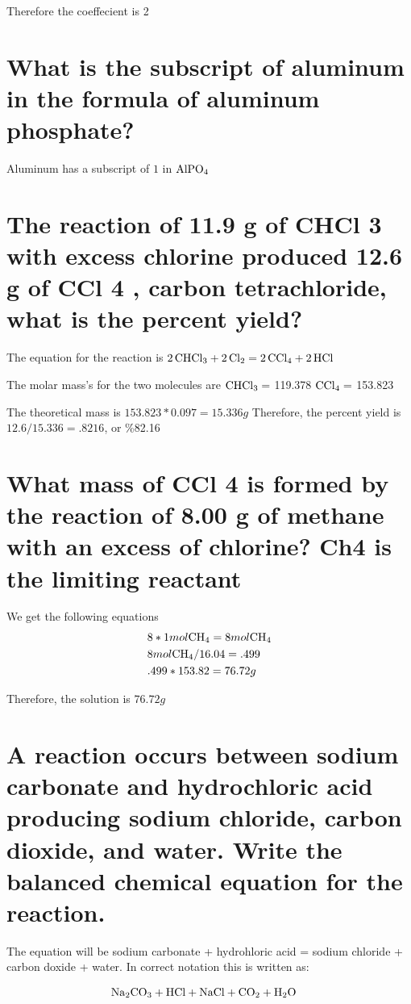 \documentclass{scrartcl}
\begin{document}
Therefore the coeffecient is 2

\section{What is the subscript of aluminum in the formula of aluminum phosphate?}
\label{sec:org9348831}
Aluminum has a subscript of \(1\) in \(\ce{AlPO4}\)

\section{The reaction of 11.9 g of CHCl 3 with excess chlorine produced 12.6 g of CCl 4 , carbon tetrachloride, what is the percent yield?}
\label{sec:orgcb9a461}
The equation for the reaction is
\(\ce{2CHCl3 + 2Cl2}=\ce{2CCl4 + 2HCl}\)

The molar mass's for the two molecules are
\(\ce{CHCl3}=\) 119.378
\(\ce{CCl4}=\) 153.823

The theoretical mass is \(153.823 * 0.097 = 15.336g\)
Therefore, the percent yield is \(12.6/15.336 = .8216\), or \%82.16

\section{What mass of CCl 4 is formed by the reaction of 8.00 g of methane with an excess of chlorine? Ch4 is the limiting reactant}
\label{sec:org2851cc0}
We get the following equations
\begin{align*}
&8*1mol\ce{CH4}=8mol\ce{CH4}\\
&8mol\ce{CH4}/16.04=.499\\
&.499*153.82=76.72g\\
\end{align*}

Therefore, the solution is \(76.72g\)

\section{A reaction occurs between sodium carbonate and hydrochloric acid producing sodium chloride, carbon dioxide, and water. Write the balanced chemical equation for the reaction.}
\label{sec:orgbd740ae}

The equation will be sodium carbonate + hydrohloric acid = sodium chloride +
carbon doxide + water. In correct notation this is written as:

\begin{align*}
&\ce{Na2CO3 + HCl}+\ce{NaCl + CO2 + H2O}
\end{align*}
\end{document}

